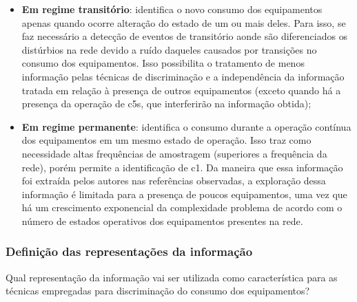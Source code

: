 \begin{itemize}
\item \textbf{Em regime transitório}: identifica o novo consumo dos
equipamentos apenas quando ocorre alteração do estado de um ou mais
deles. Para isso, se faz necessário a detecção de eventos de
transitório aonde são diferenciados os distúrbios na rede devido a
ruído daqueles causados por transições no consumo dos equipamentos.
Isso possibilita o tratamento de menos informação pelas técnicas de
discriminação e a independência da informação tratada em relação à
presença de outros equipamentos (exceto quando há a presença da
operação de \glspl{c5}, que interferirão na informação obtida);
\item \textbf{Em regime permanente}: identifica o consumo durante a
operação contínua dos equipamentos em um mesmo estado de operação.
Isso traz como necessidade altas frequências de amostragem (superiores
a frequência da rede), porém permite a identificação de \acs{c1}.
Da maneira que essa informação foi extraída pelos autores nas
referências observadas, a exploração dessa informação é limitada para
a presença de poucos equipamentos, uma vez que há um crescimento
exponencial da complexidade problema de acordo com o número de
estados operativos dos equipamentos presentes na rede.
\end{itemize}

\subsubsection{Definição das representações da informação}
\label{top:caracteristicas}

Qual representação da informação vai ser utilizada como característica
para as técnicas empregadas para discriminação do consumo dos
equipamentos?

